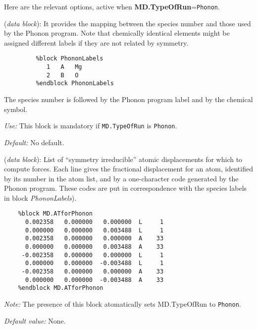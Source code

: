 \documentclass[11pt]{article}
\begin{document}
Here are the relevant options, active when {\bf MD.TypeOfRun}={\tt Phonon}.

\begin{description}
\itemsep 10pt
\parsep 0pt

\item[{\bf PhononLabels}] ({\it data block}):
It provides the mapping
between the species number and those used by the {\sc
Phonon} program. Note that chemically identical elements might be
assigned different labels if they are not related by symmetry.

\begin{verbatim}
         %block PhononLabels
            1   A   Mg
            2   B   O
         %endblock PhononLabels
\end{verbatim}

The species number is followed by the {\sc
Phonon} program label and by the chemical symbol.

{\it Use:} This block is mandatory if {\tt MD.TypeOfRun} is {\tt Phonon}.

{\it Default:} No default.

\item[{\bf MD.ATforPhonon}] ({\it data block}): List of ``symmetry
irreducible'' atomic displacements for which to compute forces. Each
line gives the fractional displacement for an atom, identified by its
number in the atom list, and by a one-character code generated by the
{\sc Phonon} program. These codes are put in correspondence with the
species labels in block \hbox{\it PhononLabels}).

\begin{verbatim}
    %block MD.ATforPhonon
      0.002358   0.000000   0.000000  L     1
      0.000000   0.000000   0.003488  L     1
      0.002358   0.000000   0.000000  A    33
      0.000000   0.000000   0.003488  A    33
     -0.002358   0.000000   0.000000  L     1
      0.000000   0.000000  -0.003488  L     1
     -0.002358   0.000000   0.000000  A    33
      0.000000   0.000000  -0.003488  A    33
    %endblock MD.ATforPhonon

\end{verbatim}

{\it Note:} The presence of this block
atomatically sets MD.TypeOfRun to {\tt Phonon}.

{\it Default value:} None.

\end{description}
\end{document}
